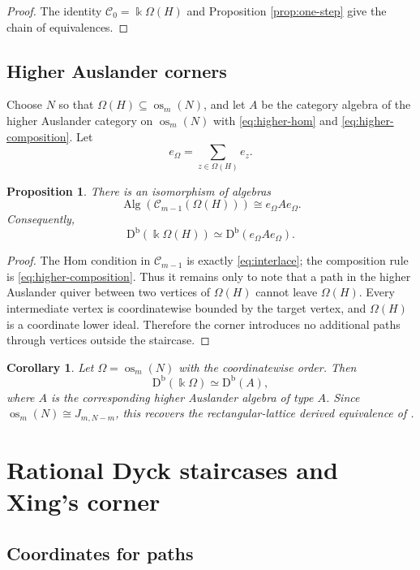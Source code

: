 \documentclass[12pt,a4paper,english,reqno]{amsart}
\theoremstyle{plain}
\newtheorem{proposition}[theorem]{Proposition}
\newtheorem{corollary}[theorem]{Corollary}
\theoremstyle{definition}
\newcommand{\kk}{\Bbbk}
\newcommand{\Db}{\mathrm D^{\mathrm b}}
\newcommand{\C}{\mathcal C}
\newcommand{\os}{\operatorname{os}}
\begin{document}
\begin{proof}
The identity $\C_0=\kk\Omega(H)$ and
Proposition \ref{prop:one-step} give the chain of equivalences.
\end{proof}

\subsection{Higher Auslander corners}

Choose $N$ so that $\Omega(H)\subseteq\os_m(N)$, and let $A$ be the
category algebra of the higher Auslander category on $\os_m(N)$ with
\eqref{eq:higher-hom} and \eqref{eq:higher-composition}.  Let
\[
 e_{\Omega}=\sum_{z\in\Omega(H)}e_z.
\]

\begin{proposition}
\label{prop:corner}
There is an isomorphism of algebras
\[
 \operatorname{Alg}\!\left(\C_{m-1}(\Omega(H))\right)
 \cong e_{\Omega}Ae_{\Omega}.
\]
Consequently,
\[
 \Db(\kk\Omega(H))\simeq\Db(e_{\Omega}Ae_{\Omega}).
\]
\end{proposition}

\begin{proof}
The Hom condition in $\C_{m-1}$ is exactly
\eqref{eq:interlace}; the composition rule is
\eqref{eq:higher-composition}.  Thus it remains only to note that a path in
the higher Auslander quiver between two vertices of $\Omega(H)$ cannot
leave $\Omega(H)$.  Every intermediate vertex is coordinatewise bounded by
the target vertex, and $\Omega(H)$ is a coordinate lower ideal.  Therefore
the corner introduces no additional paths through vertices outside the
staircase.
\end{proof}

\begin{corollary}
\label{cor:rectangular-lattice}
Let $\Omega=\os_m(N)$ with the coordinatewise order.  Then
\[
 \Db(\kk\Omega)\simeq\Db(A),
\]
where $A$ is the corresponding higher Auslander algebra of type $A$.
Since $\os_m(N)\cong J_{m,N-m}$, this recovers the rectangular-lattice
derived equivalence of \cite[Theorem~E]{Gottesman}.
\end{corollary}


\section{Rational Dyck staircases and Xing's corner}
\label{sec:dyck}

\subsection{Coordinates for paths}
\label{subsec:dyck-coordinates}
\end{document}
